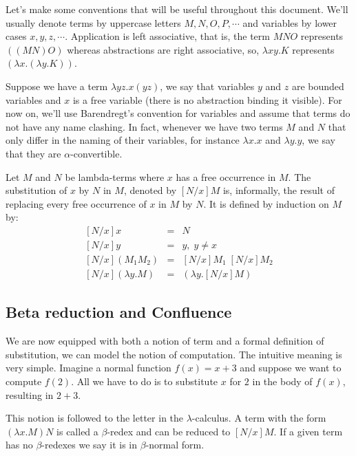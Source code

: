 Let's make some conventions that will be useful throughout this document. We'll usually denote
terms by uppercase letters $M, N, O, P, \cdots$ and variables by lower cases $x, y, z, \cdots$.
Application is left associative, that is, the term $M N O$ represents $((M N) O)$ whereas
abstractions are right associative, so, $\lambda x y. K$ represents $(\lambda x . (\lambda y.K))$.

Suppose we have a term $\lambda yz.x(yz)$, we say that variables $y$ and $z$ are bounded variables
and $x$ is a free variable (there is no abstraction binding it visible). For now on, we'll 
use Barendregt's convention for variables and assume that terms do not have any name clashing.
In fact, whenever we have two terms $M$ and $N$ that only differ in the naming of their variables,
for instance $\lambda x . x$ and $\lambda y . y$, we say that they are $\alpha$-convertible.\\

\begin{mydef}[Substitution] Let $M$ and $N$ be lambda-terms where $x$ has a free occurrence
in $M$. The substitution of $x$ by $N$ in $M$, denoted by $[N/x]M$ is, informally, the result
of replacing every free occurrence of $x$ in $M$ by $N$. It is defined by induction on $M$ by:
\begin{eqnarray*}
   {[N/x]} x & = & N \\
   {[N/x]} y & = & y, \; y \neq x \\
   {[N/x]}(M_1 M_2) & = & {[N/x]M_1\; [N/x]M_2} \\
   {[N/x]}(\lambda y . M) & = & (\lambda y . {[N/x]M})
\end{eqnarray*}
\end{mydef}

\subsection{Beta reduction and Confluence}

We are now equipped with both a notion of term and a formal definition of substitution, we can
model the notion of computation. The intuitive meaning is very simple. Imagine a normal
function $f(x) = x + 3$ and suppose we want to compute $f(2)$. All we have to do is to
substitute $x$ for $2$ in the body of $f(x)$, resulting in $2+3$.

This notion is followed to the letter in the $\lambda$-calculus. A term with the form $(\lambda x . M)N$ is
called a $\beta$-redex and can be reduced to $[N/x]M$. If a given term has no $\beta$-redexes we say
it is in $\beta$-normal form.

